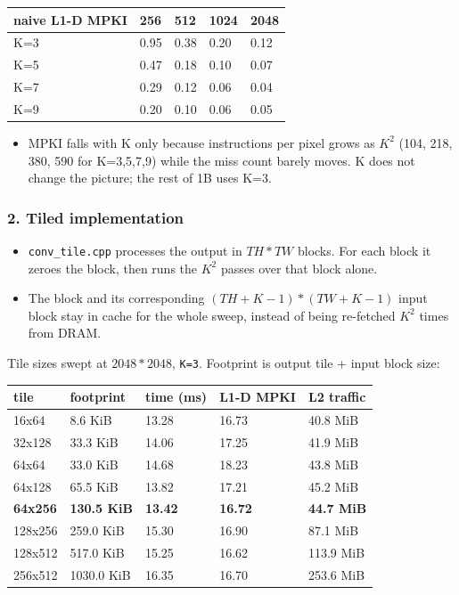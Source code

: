 \documentclass[
  10pt,
]{article}
\newcounter{none} %
\providecommand{\tightlist}{%
  \setlength{\itemsep}{0pt}\setlength{\parskip}{0pt}}
\begin{document}
{\def\LTcaptype{none} %
\begin{longtable}[]{@{}lllll@{}}
\toprule\noalign{}
naive L1-D MPKI & 256 & 512 & 1024 & 2048 \\
\midrule\noalign{}
\endhead
\bottomrule\noalign{}
\endlastfoot
K=3 & 0.95 & 0.38 & 0.20 & 0.12 \\
K=5 & 0.47 & 0.18 & 0.10 & 0.07 \\
K=7 & 0.29 & 0.12 & 0.06 & 0.04 \\
K=9 & 0.20 & 0.10 & 0.06 & 0.05 \\
\end{longtable}
}

\begin{itemize}
\tightlist
\item
  MPKI falls with K only because instructions per pixel grows as $K^2$
  (104, 218, 380, 590 for K=3,5,7,9) while the miss count barely moves.
  K does not change the picture; the rest of 1B uses K=3.
\end{itemize}

\subsubsection{2. Tiled implementation}\label{tiled-implementation}

\begin{itemize}
\tightlist
\item
  \texttt{conv\_tile.cpp} processes the output in $TH * TW$ blocks. For
  each block it zeroes the block, then runs the $K^2$ passes over that
  block alone.
\item
  The block and its corresponding $(TH+K-1) * (TW+K-1)$ input block stay in
  cache for the whole sweep, instead of being re-fetched $K^2$ times from DRAM.
\end{itemize}

Tile sizes swept at $2048*2048$, \texttt{K=3}. Footprint is output tile + input
block size:

{\def\LTcaptype{none} %
\begin{longtable}[]{@{}lllll@{}}
\toprule\noalign{}
tile & footprint & time (ms) & L1-D MPKI & L2 traffic \\
\midrule\noalign{}
\endhead
\bottomrule\noalign{}
\endlastfoot
16x64 & 8.6 KiB & 13.28 & 16.73 & 40.8 MiB \\
32x128 & 33.3 KiB & 14.06 & 17.25 & 41.9 MiB \\
64x64 & 33.0 KiB & 14.68 & 18.23 & 43.8 MiB \\
64x128 & 65.5 KiB & 13.82 & 17.21 & 45.2 MiB \\
\textbf{64x256} & \textbf{130.5 KiB} & \textbf{13.42} & \textbf{16.72} &
\textbf{44.7 MiB} \\
128x256 & 259.0 KiB & 15.30 & 16.90 & 87.1 MiB \\
128x512 & 517.0 KiB & 15.25 & 16.62 & 113.9 MiB \\
256x512 & 1030.0 KiB & 16.35 & 16.70 & 253.6 MiB \\
\end{longtable}
}
\end{document}
